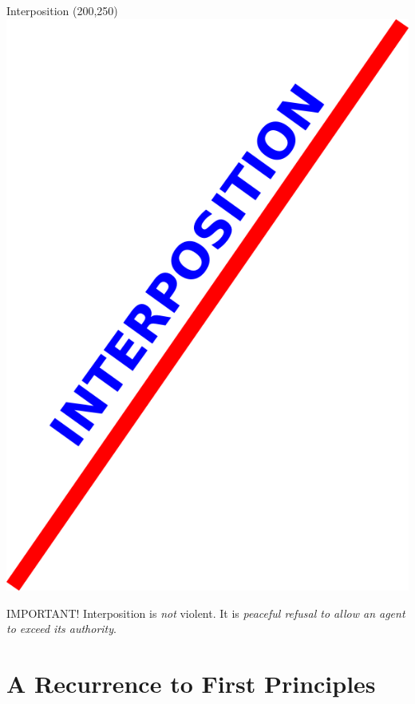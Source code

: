 \begin{frame}{Interposition}
    \Put(200,250){\includegraphics[height=0.8\textheight]{img/line.png}}
\end{frame}

\begin{frame}
    \begin{block}{IMPORTANT!}
        { \huge Interposition is \emph{not} violent. It is \emph{peaceful refusal to allow an agent to exceed its authority}.}
    \end{block}
\end{frame}

\section{A Recurrence to First Principles}

